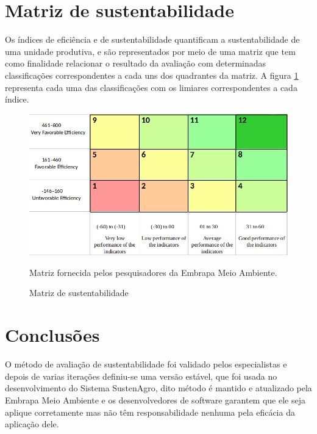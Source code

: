 \section{Matriz de sustentabilidade}

Os índices de eficiência e de sustentabilidade quantificam a sustentabilidade
de uma unidade produtiva, e são representados por meio de uma matriz
que tem como finalidade relacionar o resultado da avaliação com determinadas
classificações correspondentes a cada uns dos quadrantes da matriz.
A figura \ref{fig:Matriz-de-sustentabilidade} representa cada uma
das classificações com os limiares correspondentes a cada índice.

\begin{figure}[H]
\includegraphics[width=0.8\columnwidth]{figures/SustaiabilityMatrixDesign}

\caption{Matriz de sustentabilidade \label{fig:Matriz-de-sustentabilidade}}

Matriz fornecida pelos pesquisadores da Embrapa Meio Ambiente.

\end{figure}


\section{Conclusões}

O método de avaliação de sustentabilidade foi validado pelos especialistas
e depois de varias iterações definiu-se uma versão estável, que foi
usada no desenvolvimento do Sistema SustenAgro, dito método é mantido
e atualizado pela Embrapa Meio Ambiente e os desenvolvedores de software
garantem que ele seja aplique corretamente mas não têm responsabilidade
nenhuma pela eficácia da aplicação dele.
